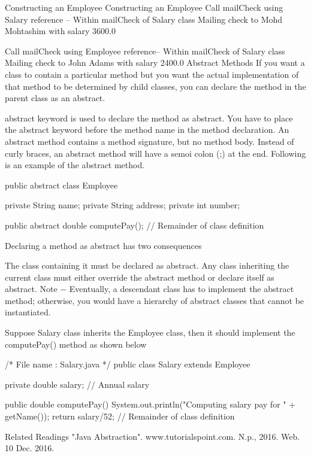 Constructing an Employee
Constructing an Employee
Call mailCheck using Salary reference --
Within mailCheck of Salary class
Mailing check to Mohd Mohtashim with salary 3600.0

Call mailCheck using Employee reference--
Within mailCheck of Salary class
Mailing check to John Adams with salary 2400.0
Abstract Methods
If you want a class to contain a particular method but you want the actual implementation of that method to be determined by child classes, you can declare the method in the parent class as an abstract.

abstract keyword is used to declare the method as abstract.
You have to place the abstract keyword before the method name in the method declaration.
An abstract method contains a method signature, but no method body.
Instead of curly braces, an abstract method will have a semoi colon (;) at the end.
Following is an example of the abstract method.

public abstract class Employee {
   private String name;
   private String address;
   private int number;

   public abstract double computePay();
   // Remainder of class definition
}
Declaring a method as abstract has two consequences

The class containing it must be declared as abstract.
Any class inheriting the current class must either override the abstract method or declare itself as abstract.
Note − Eventually, a descendant class has to implement the abstract method; otherwise, you would have a hierarchy of abstract classes that cannot be instantiated.

Suppose Salary class inherits the Employee class, then it should implement the computePay() method as shown below

/* File name : Salary.java */
public class Salary extends Employee {
   private double salary;   // Annual salary

   public double computePay() {
      System.out.println("Computing salary pay for " + getName());
      return salary/52;
   }
   // Remainder of class definition
}
Related Readings
"Java Abstraction". www.tutorialspoint.com. N.p., 2016. Web. 10 Dec. 2016.